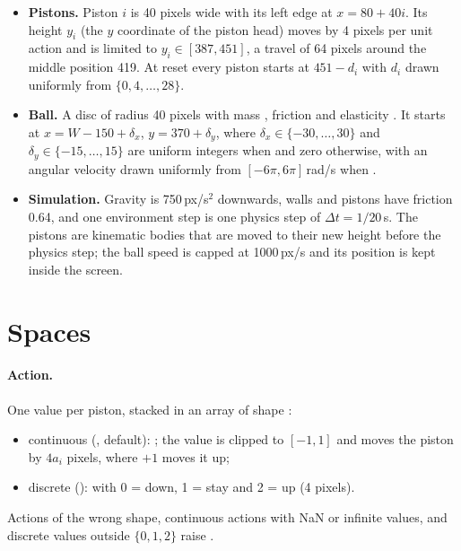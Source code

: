 \begin{itemize}
  \item \textbf{Pistons.} Piston $i$ is 40 pixels wide with its left edge at
        $x = 80 + 40i$. Its height $y_i$ (the $y$ coordinate of the piston
        head) moves by 4 pixels per unit action and is limited to
        $y_i \in [387, 451]$, a travel of 64 pixels around the middle position
        419. At reset every piston starts at $451 - d_i$ with $d_i$ drawn
        uniformly from $\{0, 4, \dots, 28\}$.
  \item \textbf{Ball.} A disc of radius 40 pixels with mass
        , friction  and elasticity
        . It starts at
        $x = W - 150 + \delta_x$, $y = 370 + \delta_y$, where
        $\delta_x \in \{-30, \dots, 30\}$ and $\delta_y \in \{-15, \dots, 15\}$
        are uniform integers when  and zero otherwise,
        with an angular velocity drawn uniformly from $[-6\pi, 6\pi]$\,rad/s
        when .
  \item \textbf{Simulation.} Gravity is 750\,px/s$^2$ downwards, walls and
        pistons have friction 0.64, and one environment step is one physics
        step of $\Delta t = 1/20$\,s. The pistons are kinematic bodies that are
        moved to their new height before the physics step; the ball speed is
        capped at 1000\,px/s and its position is kept inside the screen.
\end{itemize}

\section{Spaces}\label{sec:pistonball-spaces}

\paragraph{Action.} One value per piston, stacked in an array of shape
:
\begin{itemize}
  \item continuous (, default):
        ; the value is clipped to $[-1, 1]$ and
        moves the piston by $4 a_i$ pixels, where $+1$ moves it up;
  \item discrete ():  with
        0 = down, 1 = stay and 2 = up (4 pixels).
\end{itemize}
Actions of the wrong shape, continuous actions with NaN or infinite values, and
discrete values outside $\{0, 1, 2\}$ raise .

